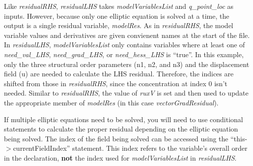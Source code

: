 \documentclass[10pt]{article} %
\begin{document}
Like \emph{residualRHS}, \emph{residualLHS} takes \emph{modelVariablesList} and  \emph{q\_point\_loc} as inputs. However, because only one elliptic equation is solved at a time, the output is a single residual variable, \emph{modelRes}. As in \emph{residualRHS}, the model variable values and derivatives are given convienent names at the start of the file. In \emph{residualLHS}, \emph{modelVariablesList} only contains variables where at least one of \emph{need\_val\_LHS}, \emph{need\_grad\_LHS}, or \emph{need\_hess\_LHS} is ``true''. In this example, only the three structural order parameters (n1, n2, and n3) and the displacement field (u) are needed to calculate the LHS residual. Therefore, the indices are shifted from those in \emph{residualRHS}, since the concentration at index 0 isn't needed. Similar to \emph{residualRHS}, the value of \emph{ruxV} is set and then used to update the appropriate member of \emph{modelRes} (in this case \emph{vectorGradResidual}).

If multiple elliptic equations need to be solved, you will need to use conditional statements to calculate the proper residual depending on the elliptic equation being solved. The index of the field being solved can be accessed using the ``this-$>$currentFieldIndex'' statement. This index refers to the variable's overall order in the declaration, \textbf{not} the index used for \emph{modelVariablesList} in \emph{residualLHS}.
\end{document}
